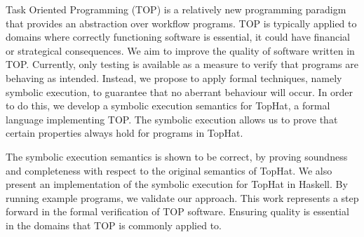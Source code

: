 
Task Oriented Programming (TOP) is a relatively new programming paradigm that provides an abstraction over workflow programs.
TOP is typically applied to domains where correctly functioning software is essential, it could have financial or strategical consequences.
We aim to improve the quality of software written in TOP.
Currently, only testing is available as a measure to verify that programs are behaving as intended.
Instead, we propose to apply formal techniques, namely symbolic execution, to guarantee that no aberrant behaviour will occur.
In order to do this, we develop a symbolic execution semantics for TopHat,
a formal language implementing TOP.
The symbolic execution allows us to prove that certain properties always hold for programs in TopHat.

The symbolic execution semantics is shown to be correct, by proving soundness and completeness with respect to the original semantics of TopHat.
We also present an implementation of the symbolic execution for TopHat in Haskell.
By running example programs, we validate our approach.
This work represents a step forward in the formal verification of TOP software.
Ensuring quality is essential in the domains that TOP is commonly applied to.


